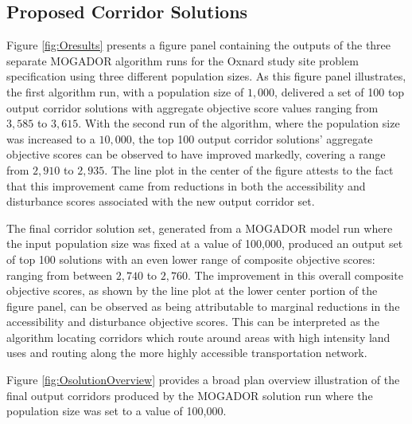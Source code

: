     \subsection{Proposed Corridor Solutions}

Figure \ref{fig:Oresults} presents a figure panel containing the outputs of the three separate MOGADOR algorithm runs for the Oxnard study site problem specification using three different population sizes. As this figure panel illustrates, the first algorithm run, with a population size of $1,000$, delivered a set of 100 top output corridor solutions with aggregate objective score values ranging from $3,585$ to $3,615$. With the second run of the algorithm, where the population size was increased to a $10,000$, the top 100 output corridor solutions' aggregate objective scores can be observed to have improved markedly, covering a range from $2,910$ to $2,935$. The line plot in the center of the figure attests to the fact that this improvement came from reductions in both the accessibility and disturbance scores associated with the new output corridor set.

The final corridor solution set, generated from a MOGADOR model run where the input population size was fixed at a value of 100,000, produced an output set of top 100 solutions with an even lower range of composite objective scores: ranging from between $2,740$ to $2,760$. The improvement in this overall composite objective scores, as shown by the line plot at the lower center portion of the figure panel, can be observed as being attributable to marginal reductions in the accessibility and disturbance objective scores.  This can be interpreted as the algorithm locating corridors which route around areas with high intensity land uses and routing along the more highly accessible transportation network.

Figure \ref{fig:OsolutionOverview} provides a broad plan overview illustration of the final output corridors produced by the MOGADOR solution run where the population size was set to a value of 100,000. 


